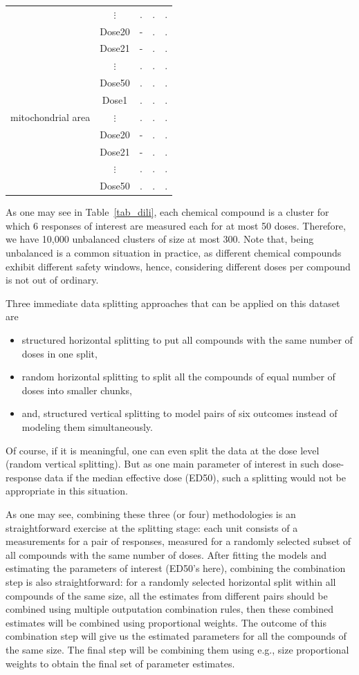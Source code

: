 \documentclass[11pt,a5paper,twoside]{book}
\begin{document}
\begin{table}[h]
{\begin{tabular}{l|c|ccc}
 & $\vdots$ &. & .& .\\ 
  & Dose20 &- & .& .\\ 
   & Dose21 &- & .& .\\ 
    & $\vdots$ &. & .& .\\ 
 & Dose50 &. & .& .\\ 
 \hline
      \multirow{3}{*}{mitochondrial area} & Dose1 &. & .& . \\ 
 & $\vdots$ &. & .& .\\ 
  & Dose20 &- & .& .\\ 
   & Dose21 &- & .& .\\ 
    & $\vdots$ &. & .& .\\ 
 & Dose50 &. & .& .\\ 
   \hline\hline
\end{tabular}}
\end{table}


As one may see in Table~\ref{tab_dili}, each chemical compound is a cluster for which 6 responses of interest are measured each for at most 50 doses. Therefore, we have 10,000 unbalanced clusters of size at most 300. Note that, being unbalanced is a common situation in practice, as different chemical compounds exhibit different safety windows, hence, considering different doses per compound is not out of ordinary. 

Three immediate data splitting approaches that can be applied on this dataset are
\begin{itemize}
\item structured horizontal splitting to put all compounds with the same number of doses in one split,
\item random horizontal splitting to split all the compounds of equal number of doses into smaller chunks,
\item and, structured vertical splitting to model pairs of six outcomes instead of modeling them simultaneously.
\end{itemize}
Of course, if it is meaningful, one can even split the data at the dose level (random vertical splitting). But as one main parameter of interest in such dose-response data if the median effective dose (ED50), such a splitting would not be appropriate in this situation. 

As one may see, combining these three (or four) methodologies is an straightforward exercise at the splitting stage: each unit consists of a measurements for a pair of responses, measured for a randomly selected subset of all compounds with the same number of doses. After fitting the models and estimating the parameters of interest (ED50's here), combining the combination step is also straightforward: for a randomly selected horizontal split within all compounds of the same size, all the estimates from different pairs should be combined using multiple outputation combination rules, then these combined estimates will be combined using proportional weights. The outcome of this combination step will give us the estimated parameters for all the compounds of the same size. The final step will be combining them using e.g., size proportional weights to obtain the final set of parameter estimates.
\end{document}
